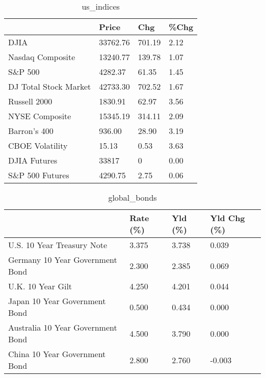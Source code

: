 \documentclass{article}%
\begin{document}
%


\begin{table}[htbp]%
\caption{us\_indices}%
\centering%
\begin{adjustbox}{width=1\textwidth}%
\begin{tabular}{llll}
\toprule
                      &    Price &    Chg & \%Chg \\
\midrule
                 DJIA & 33762.76 & 701.19 & 2.12 \\
     Nasdaq Composite & 13240.77 & 139.78 & 1.07 \\
              S\&P 500 &  4282.37 &  61.35 & 1.45 \\
DJ Total Stock Market & 42733.30 & 702.52 & 1.67 \\
         Russell 2000 &  1830.91 &  62.97 & 3.56 \\
       NYSE Composite & 15345.19 & 314.11 & 2.09 \\
         Barron's 400 &   936.00 &  28.90 & 3.19 \\
      CBOE Volatility &    15.13 &   0.53 & 3.63 \\
         DJIA Futures &    33817 &      0 & 0.00 \\
      S\&P 500 Futures &  4290.75 &   2.75 & 0.06 \\
\bottomrule
\end{tabular}
%
\end{adjustbox}%
\end{table}

%


\begin{table}[htbp]%
\caption{global\_bonds}%
\centering%
\begin{adjustbox}{width=1\textwidth}%
\begin{tabular}{llll}
\toprule
                                  & Rate (\%) & Yld (\%) & Yld Chg (\%) \\
\midrule
       U.S. 10 Year Treasury Note &    3.375 &   3.738 &       0.039 \\
  Germany 10 Year Government Bond &    2.300 &   2.385 &       0.069 \\
                U.K. 10 Year Gilt &    4.250 &   4.201 &       0.044 \\
    Japan 10 Year Government Bond &    0.500 &   0.434 &       0.000 \\
Australia 10 Year Government Bond &    4.500 &   3.790 &       0.000 \\
    China 10 Year Government Bond &    2.800 &   2.760 &      -0.003 \\
\bottomrule
\end{tabular}
%
\end{adjustbox}%
\end{table}
\end{document}
